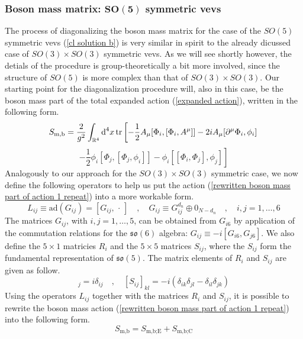 \subsubsection[Boson mass matrix: $SO(5)$ symmetric vevs]{Boson mass matrix: $\mathbf{SO(5)}$ symmetric vevs}
The process of diagonalizing the boson mass matrix for the case of the $SO(5)$ symmetric vevs (\ref{cl solution b}) is very similar in spirit to the already dicussed case of $SO(3) \times SO(3)$ symmetric vevs. As we will see shortly however, the detials of the procedure is group-theoretically a bit more involved, since the structure of $SO(5)$ is more complex than that of $SO(3) \times SO(3)$. Our starting point for the diagonalization procedure will, also in this case, be the boson mass part of the total expanded action (\ref{expanded action}), written in the following form.
%
%
\begin{equation*}
S_{\text{m,b}}
=
\frac{2}{g^2} \int_{\mathbb{R}^4} \text{d}^4 x 
\tr \left[
- \frac{1}{2} A_\mu [\Phi_i, [\Phi_i, A^\mu]]
- 2 i A_\mu [\partial^\mu \Phi_i, \phi_i]
\right.
\end{equation*}
%
%
\begin{equation}\label{rewritten boson mass part of action 1 repeat}
\left.
- \frac{1}{2} \phi_i [\Phi_j, [\Phi_j, \phi_i]]
- \phi_i [[\Phi_i, \Phi_j], \phi_j]
\right]
\end{equation}
%
%
Analogously to our approach for the $SO(3) \times SO(3)$ symmetric case, we now define the following operators to help us put the action (\ref{rewritten boson mass part of action 1 repeat}) into a more workable form.
%
%
\begin{equation}
L_{ij} \equiv \text{ad}(G_{ij}) = [G_{ij}, \, \cdot \,]
%
\quad , \quad
%
G_{ij} \equiv G_{ij}^{d_n} \oplus 0_{N - d_n}
%
\quad , \quad
%
i,j = 1, \ldots , 6
\end{equation}
%
%
The matrices $G_{ij}$, with $i,j = 1,\ldots , 5$, can be obtained from $G_{i6}$ by application of the commutation relations for the $\mathfrak{so}(6)$ algebra: $G_{ij} \equiv -i [G_{i6}, G_{j6}]$. We also define the $5 \times 1$ matricies $R_i$ and the $5 \times 5$ matrices $S_{ij}$, where the $S_{ij}$ form the fundamental representation of $\mathfrak{so}(5)$. The matrix elements of $R_i$ and $S_{ij}$ are given as follow.
%
%
\begin{equation}
[R_i]_j = i \delta_{ij}
%
\quad , \quad
%
[S_{ij}]_{kl} = -i ( \delta_{ik} \delta_{jl} - \delta_{il} \delta_{jk} )
\end{equation}
%
%
Using the operators $L_{ij}$ together with the matrices $R_i$ and $S_{ij}$, it is possible to rewrite the boson mass action (\ref{rewritten boson mass part of action 1 repeat}) into the following form.
%
%
\begin{equation}
S_{\text{m,b}} = S_{\text{m,b;E}} + S_{\text{m,b;C}}
\end{equation}
%
%

